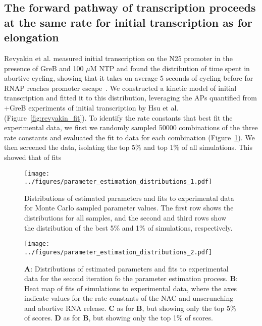%
\subsection{The forward pathway of transcription proceeds at the same rate
for initial transcription as for elongation}
Revyakin et al. measured initial transcription on the N25 promoter in the
presence of GreB and 100 $\mu$M NTP and found the distribution of time spent
in abortive cycling, showing that it takes on average 5 seconds of cycling
before for RNAP reaches promoter escape~\cite{revyakin_abortive_2006}. We
constructed a kinetic model of initial transcription and fitted it to this
distribution, leveraging the APs quantified from +GreB experiments of initial
transcription by Hsu et al. ~\cite{hsu_initial_2006}
(Figure~\ref{fig:revyakin_fit}). To identify the rate constants that best fit
the experimental data, we first we randomly sampled 50000 combinations of the
three rate constants and evaluated the fit to data for each combination
(Figure~\ref{fig:parameter_estimation_1}). We then screened the data,
isolating the top 5\% and top 1\% of all simulations. This showed that 
of fits


\begin{figure}
	\begin{center}
      \texttt{[image: ../figures/parameter\_estimation\_distributions\_1.pdf]}
	\end{center}
    \caption{Distributions of estimated parameters and fits to experimental
      data for Monte Carlo sampled parameter values.  The first row shows the
      distributions for all samples, and the second and third rows show the
      distribution of the best 5\% and 1\% of simulations, respectively.}
      \label{fig:parameter_estimation_1}
\end{figure}

\begin{figure}
	\begin{center}
      \texttt{[image: ../figures/parameter\_estimation\_distributions\_2.pdf]}
	\end{center}
    \caption{
      \textbf{A}: Distributions of estimated parameters and fits to
      experimental data for the second iteration fo the parameter
      estimation process. \textbf{B}: Heat map of fits of simulations to experimental
      data, where the axes indicate values for the rate constants of the NAC
      and unscrunching and abortive RNA release. \textbf{C} as for \textbf{B},
      but showing only the top 5\% of scores. \textbf{D} as for \textbf{B},
      but showing only the top 1\% of scores.}
      \label{fig:parameter_estimation_2}
\end{figure}

